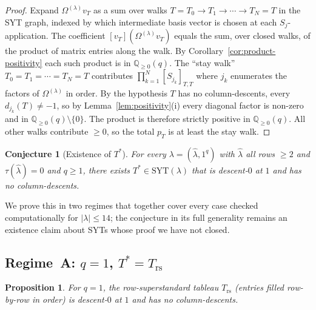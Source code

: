 \documentclass[11pt]{article}
\newtheorem{proposition}[theorem]{Proposition}
\newtheorem{conjecture}[theorem]{Conjecture}
\theoremstyle{definition}
\newcommand{\Om}{\Omega}
\newcommand{\hatl}{\widehat\lambda}
\newcommand{\SYT}{\mathrm{SYT}}
\newcommand{\Trs}{T_{\mathrm{rs}}}
\newcommand{\Tstar}{T^*}
\begin{document}
\begin{proof}
Expand $\Om^{(\lambda)} v_T$ as a sum over walks
$T = T_0 \to T_1 \to \cdots \to T_N = T$ in the SYT graph, indexed by
which intermediate basis vector is chosen at each $S_j$-application.
The coefficient $[v_T](\Om^{(\lambda)} v_T)$ equals the sum, over closed
walks, of the product of matrix entries along the walk.  By
Corollary~\ref{cor:product-positivity} each such product is in
$\mathbb{Q}_{\ge 0}(q)$.  The ``stay walk'' $T_0 = T_1 = \cdots = T_N = T$
contributes $\prod_{k=1}^{N} [S_{j_k}]_{T,T}$ where $j_k$ enumerates
the factors of $\Om^{(\lambda)}$ in order.  By the hypothesis $T$ has
no column-descents, every $d_{j_k}(T) \ne -1$, so by
Lemma~\ref{lem:positivity}(i) every diagonal factor is non-zero and in
$\mathbb{Q}_{\ge 0}(q) \setminus \{0\}$.  The product is therefore
strictly positive in $\mathbb{Q}_{\ge 0}(q)$.  All other walks
contribute $\ge 0$, so the total $p_T$ is at least the stay walk.
\end{proof}

\begin{conjecture}[Existence of $T^*$]\label{conj:T-exists}
For every $\lambda = (\hatl, 1^q)$ with $\hatl$ all rows $\ge 2$ and
$\tau(\hatl) = 0$ and $q \ge 1$, there exists $T^* \in \SYT(\lambda)$
that is descent-$0$ at $1$ and has no column-descents.
\end{conjecture}

We prove this in two regimes that together cover every case checked
computationally for $|\lambda| \le 14$; the conjecture in its full
generality remains an existence claim about SYTs whose proof we have
not closed.

\subsection{Regime~A: $q = 1$, $\Tstar = \Trs$}

\begin{proposition}\label{prop:Trs-q1}
For $q = 1$, the row-superstandard tableau
$\Trs$ (entries filled row-by-row in order) is descent-$0$ at $1$ and
has no column-descents.
\end{proposition}
\end{document}
